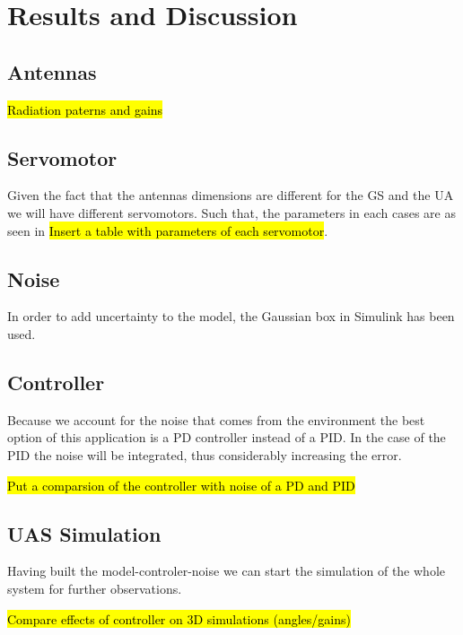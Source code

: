 \chapter{Results and Discussion}\label{ch:conclusion}

\section{Antennas}

\hl{Radiation paterns and gains}

\section{Servomotor}

Given the fact that the antennas dimensions are different for the GS and the UA we will have different servomotors. Such that, the parameters in each cases are as seen in \hl{Insert a table with parameters of each servomotor}.

\section{Noise}

In order to add uncertainty to the model, the Gaussian box in Simulink has been used. 

\section{Controller}

Because we account for the noise that comes from the environment the best option of this application is a PD controller instead of a PID. In the case of the PID the noise will be integrated, thus considerably increasing the error. 

\hl{Put a comparsion of the controller with noise of a PD and PID} 

\section{UAS Simulation}

Having built the model-controler-noise we can start the simulation of the whole system for further observations.

\hl{Compare effects of controller on 3D simulations (angles/gains)}